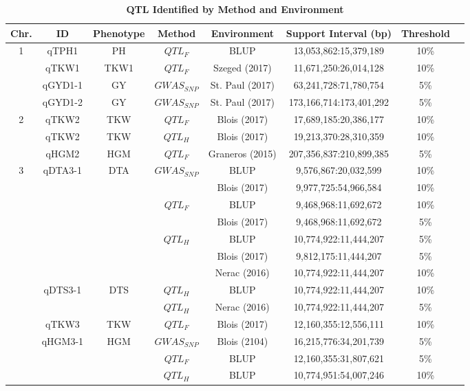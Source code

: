\documentclass[9pt,twocolumn,twoside]{gsag3jnl}
\begin{document}
\begingroup[ht]
  \centering
\begin{longtable}{c c c c c c c c}
\caption{\textbf{QTL Identified by Method and Environment} \label{tab:suptable2}} \\
\hline \hline
Chr. & ID & Phenotype & Method & Environment & Support Interval (bp) & Threshold\\
\hline
1  & qTPH1 & PH & $QTL_F$ & BLUP & 13,053,862:15,379,189 & 10\% \\
&  qTKW1 & TKW1 & $QTL_F$ & Szeged (2017) & 11,671,250:26,014,128 & 10\% \\
&  qGYD1-1 & GY & $GWAS_{SNP}$ & St. Paul (2017) & 63,241,728:71,780,754 & 5\% \\
&  qGYD1-2 & GY & $GWAS_{SNP}$ & St. Paul (2017) & 173,166,714:173,401,292 & 5\% \\
\hline
2  & qTKW2 & TKW & $QTL_F$ & Blois (2017) & 17,689,185:20,386,177 & 10\% \\
&  qTKW2 & TKW & $QTL_H$ & Blois (2017) & 19,213,370:28,310,359 & 10\% \\
&  qHGM2 & HGM & $QTL_F$ & Graneros (2015) & 207,356,837:210,899,385 & 5\% \\
\hline
3 &  qDTA3-1 & DTA & $GWAS_{SNP}$ & BLUP & 9,576,867:20,032,599 & 10\% \\
&  & & & Blois (2017) & 9,977,725:54,966,584 & 10\% \\
&  & & $QTL_F$ & BLUP & 9,468,968:11,692,672 & 10\% \\
&  & & & Blois (2017) & 9,468,968:11,692,672 & 5\% \\
&  & & $QTL_H$ & BLUP & 10,774,922:11,444,207 & 5\% \\
&  & & & Blois (2017) & 9,812,175:11,444,207 & 5\% \\
&  & & & Nerac (2016) & 10,774,922:11,444,207 & 10\% \\
&  qDTS3-1 & DTS & $QTL_H$ & BLUP & 10,774,922:11,444,207 & 10\% \\
&  & & $QTL_H$ & Nerac (2016) & 10,774,922:11,444,207 & 5\% \\
&  qTKW3 & TKW & $QTL_F$ & Blois (2017) & 12,160,355:12,556,111 & 10\% \\
&  qHGM3-1 & HGM & $GWAS_{SNP}$ & Blois (2104) & 16,215,776:34,201,739 & 5\% \\
&  & & $QTL_F$ & BLUP & 12,160,355:31,807,621 & 5\% \\
&  & & $QTL_H$ & BLUP & 10,774,951:54,007,246 & 10\% \\


\end{longtable}
\end{document}
